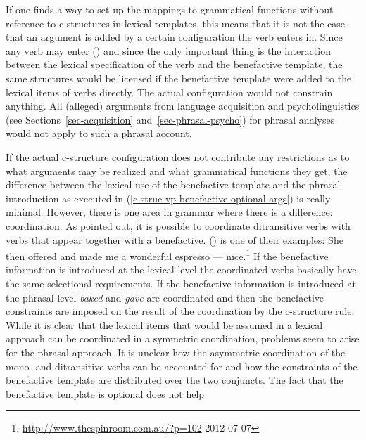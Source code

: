 If one finds a way to set up the mappings to grammatical functions without reference to c-structures
in lexical templates, this means that it is not the case that an argument is added by
a certain configuration the verb enters in. Since any verb may enter () and since the only
important thing is the interaction between the lexical specification of the verb and the benefactive
template, the same structures would be licensed if the benefactive template were added to the
lexical items of verbs directly. The actual configuration would not constrain anything. All (alleged) arguments
from language acquisition and psycholinguistics (see Sections~\ref{sec-acquisition} and~\ref{sec-phrasal-psycho}) for phrasal analyses would not apply to such a phrasal account.

If the actual c-structure configuration does not contribute any restrictions as to what arguments
may be realized and what grammatical functions they get, the difference between the lexical use of the
benefactive template and the phrasal introduction as executed in
(\ref{c-struc-vp-benefactive-optional-args}) is really minimal. However, there is one area in
grammar where there is a difference: coordination. As \citet[Section~6.1]{MWArgSt} pointed out, it is
possible to coordinate ditransitive verbs with verbs that appear together with a
benefactive. () is one of their examples:
\ea%
\label{ex-coordination-benefactive}
\label{ex-offered-and-made}
She then offered and made me a wonderful espresso --- nice.\footnote{%
  \url{http://www.thespinroom.com.au/?p=102} 2012-07-07}
\z
If the benefactive information is introduced at the lexical level the coordinated verbs basically
have the same selectional requirements. If the benefactive information is introduced at the phrasal
level \emph{baked} and \emph{gave} are coordinated and then the benefactive constraints are imposed
on the result of the coordination by the c-structure rule. While it is clear that the lexical items
that would be assumed in a lexical approach can be coordinated in a symmetric coordination, problems
seem to arise for the phrasal approach. It is unclear how the asymmetric coordination of the mono-
and ditransitive verbs can be accounted for and how the constraints of the benefactive template are
distributed over the two conjuncts. The fact that the benefactive template is optional does not help
